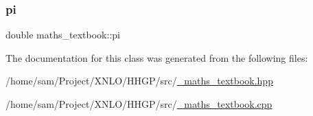 \subsubsection{\texorpdfstring{pi}{pi}}
{\footnotesize\ttfamily double maths\+\_\+textbook\+::pi}



The documentation for this class was generated from the following files\+:\begin{DoxyCompactItemize}
\item 
/home/sam/\+Project/\+X\+N\+L\+O/\+H\+H\+G\+P/src/\hyperlink{__maths__textbook_8hpp}{\+\_\+maths\+\_\+textbook.\+hpp}\item 
/home/sam/\+Project/\+X\+N\+L\+O/\+H\+H\+G\+P/src/\hyperlink{__maths__textbook_8cpp}{\+\_\+maths\+\_\+textbook.\+cpp}\end{DoxyCompactItemize}
